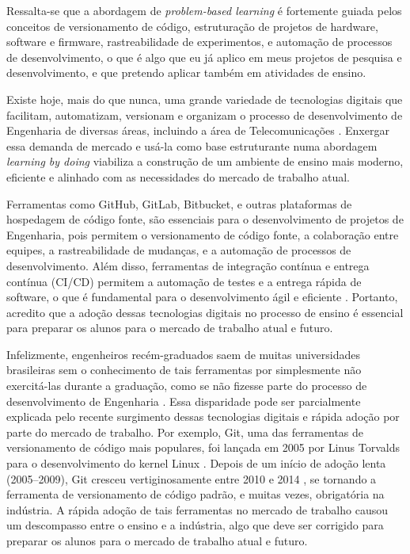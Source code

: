 \documentclass{article}
\begin{document}
Ressalta-se que a abordagem de \textit{problem-based learning} é fortemente guiada pelos conceitos de versionamento de código, estruturação de projetos de hardware, software e firmware, rastreabilidade de experimentos, e automação de processos de desenvolvimento, o que é algo que eu já aplico em meus projetos de pesquisa e desenvolvimento, e que pretendo aplicar também em atividades de ensino.

Existe hoje, mais do que nunca, uma grande variedade de tecnologias digitais que facilitam, automatizam, versionam e organizam o processo de desenvolvimento de Engenharia de diversas áreas, incluindo a área de Telecomunicações \cite{deng2026untangling}. Enxergar essa demanda de mercado e usá-la como base estruturante numa abordagem \textit{learning by doing} viabiliza a construção de um ambiente de ensino mais moderno, eficiente e alinhado com as necessidades do mercado de trabalho atual.

Ferramentas como GitHub, GitLab, Bitbucket, e outras plataformas de hospedagem de código fonte, são essenciais para o desenvolvimento de projetos de Engenharia, pois permitem o versionamento de código fonte, a colaboração entre equipes, a rastreabilidade de mudanças, e a automação de processos de desenvolvimento. Além disso, ferramentas de integração contínua e entrega contínua (CI/CD) permitem a automação de testes e a entrega rápida de software, o que é fundamental para o desenvolvimento ágil e eficiente \cite{deng2026untangling}. Portanto, acredito que a adoção dessas tecnologias digitais no processo de ensino é essencial para preparar os alunos para o mercado de trabalho atual e futuro.

Infelizmente, engenheiros recém-graduados saem de muitas universidades brasileiras sem o conhecimento de tais ferramentas por simplesmente não exercitá-las durante a graduação, como se não fizesse parte do processo de desenvolvimento de Engenharia \cite{desa2023explorando}. Essa disparidade pode ser parcialmente explicada pelo recente surgimento dessas tecnologias digitais e rápida adoção por parte do mercado de trabalho. Por exemplo, Git, uma das ferramentas de versionamento de código mais populares, foi lançada em 2005 por Linus Torvalds para o desenvolvimento do kernel Linux \cite{northcutt2023evolution}. Depois de um início de adoção lenta (2005--2009), Git cresceu vertiginosamente entre 2010 e 2014 \cite{hecht2020brief}, se tornando a ferramenta de versionamento de código padrão, e muitas vezes, obrigatória na indústria. A rápida adoção de tais ferramentas no mercado de trabalho causou um descompasso entre o ensino e a indústria, algo que deve ser corrigido para preparar os alunos para o mercado de trabalho atual e futuro.
\end{document}
